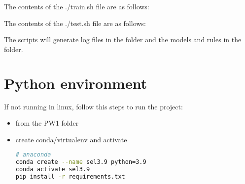 The contents of the ./train.sh file are as follows:



The contents of the ./test.sh file are as follows:



The scripts will generate log files in the  folder and the models and rules in the  folder.

\section{Python environment}
\label{section:python environment}

If not running in linux, follow this steps to run the project:

\begin{itemize}
    \item from the PW1 folder
    \item create conda/virtualenv and activate
    \begin{lstlisting}[language=bash]
# anaconda
conda create --name sel3.9 python=3.9
conda activate sel3.9
pip install -r requirements.txt


\end{lstlisting}
\end{itemize}
